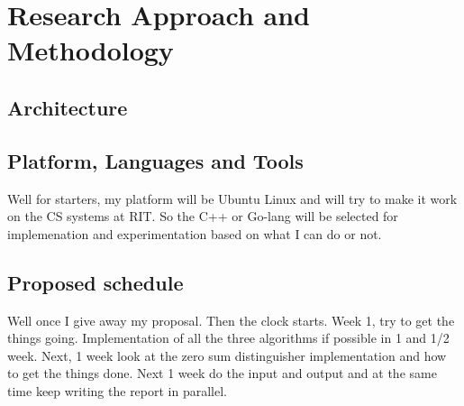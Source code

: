 \chapter{Research Approach and Methodology}







\section{Architecture}


\section{Platform, Languages and Tools}
Well for starters, my platform will be Ubuntu Linux and will try to make it work on the CS systems at RIT. So the
C++ or Go-lang will be selected for implemenation and experimentation based on what I can do or not.

\section{Proposed schedule}
Well once I give away my proposal. Then the clock starts. Week 1, try to get the things going. Implementation of all
the three algorithms if possible in 1 and 1/2 week. Next, 1 week look at the zero sum distinguisher implementation
and how to get the things done. Next 1 week do the input and output and at the same time keep writing the report in
parallel.
